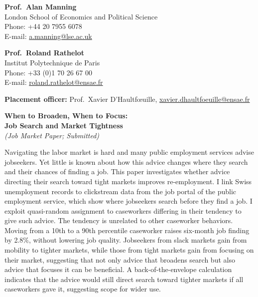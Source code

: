 \documentclass[11pt]{article}
\begin{document}
\vspace{6mm}
\begin{minipage}[t]{0.48\textwidth}
\textbf{Prof.\ Alan Manning}\\
London School of Economics and Political Science\\
Phone: +44 20 7955 6078\\
E-mail: \href{mailto:a.manning@lse.ac.uk}{a.manning@lse.ac.uk}
\end{minipage}\hfill
\begin{minipage}[t]{0.48\textwidth}
\textbf{Prof.\ Roland Rathelot}\\
Institut Polytechnique de Paris\\
Phone: +33 (0)1 70 26 67 00\\
E-mail: \href{mailto:roland.rathelot@ensae.fr}{roland.rathelot@ensae.fr}
\end{minipage}

\vspace{6mm}
\noindent\textbf{Placement officer:} Prof.\ Xavier D'Haultf\oe uille, \href{mailto:xavier.dhaultfoeuille@ensae.fr}{xavier.dhaultfoeuille@ensae.fr}

\clearpage

\hypertarget{abs:jmp}{}%
\begin{center}
{\Large\bfseries When to Broaden, When to Focus:\\ Job Search and Market Tightness}\\[1mm]
{\itshape (Job Market Paper; Submitted)}
\end{center}

Navigating the labor market is hard and many public employment services advise jobseekers. Yet little is known about how this advice changes where they search and their chances of finding a job. This paper investigates whether advice directing their search toward tight markets improves re-employment. I link Swiss unemployment records to clickstream data from the job portal of the public employment service, which show where jobseekers search before they find a job. I exploit quasi-random assignment to caseworkers differing in their tendency to give such advice. The tendency is unrelated to other caseworker behaviors. Moving from a 10th to a 90th percentile caseworker raises six-month job finding by 2.8\%, without lowering job quality. Jobseekers from slack markets gain from mobility to tighter markets, while those from tight markets gain from focusing on their market, suggesting that not only advice that broadens search but also advice that focuses it can be beneficial. A back-of-the-envelope calculation indicates that the advice would still direct search toward tighter markets if all caseworkers gave it, suggesting scope for wider use.
\end{document}
